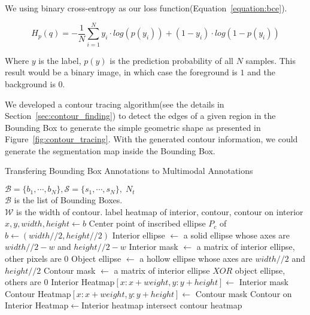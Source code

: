 \documentclass{article}
\begin{document}
{We using binary cross-entropy as our loss function(Equation~\ref{equation:bce}).

\begin{equation}
  H_p(q)=-\frac{1}{N}\sum^N_{i=1}y_i \cdot log(p(y_i))+(1-y_i)\cdot log(1-p(y_i))\label{equation:bce}
\end{equation}

Where $y$ is the label, $p(y)$ is the prediction probability of all $N$ samples. This result would be a binary image, in which case the foreground is $1$ and the background is $0$.

We developed a contour tracing algorithm(see the details in Section~\ref{sec:contour_finding}) to detect the edges of a given region in the Bounding Box to generate the simple geometric shape as presented in Figure~\ref{fig:contour_tracing}.
With the generated contour information, we could generate the segmentation map inside the Bounding Box.




\begin{algorithm}
  \caption{Transfering Bounding Box Annotations to Multimodal Annotations\label{algo:multimodal}}
  \begin{algorithmic}[1]
     \Require
     $\mathcal{B}=\{b_1,\cdots,b_N\}, \mathcal{S}=\{s_1,\cdots,s_N\},\;N_t$\\
     $\mathcal{B}$ is the list of Bounding Boxes.\\
     $\mathcal{W}$ is the width of contour.
     \Ensure
     label heatmap of interior, contour, contour on interior 
        \State $x, y, width, height \gets b$
        \State Center point of inscribed ellipse $P_c$ of $b \gets (width//2, height//2)$ 
        \State Interior ellipse $\gets$ a solid ellipse whose axes are $width//2-w$ and $height//2-w$
        \State Interior mask $\gets$ a matrix of interior ellipse, other pixels are $0$
        \State Object ellipse $\gets$ a hollow ellipse whose axes are $width//2$ and $height//2$
        \State Contour mask $\gets$ a matrix of interior ellipse $XOR$ object ellipse, others are $0$
        \State Interior Heatmap$[x:x+weight, y:y+height] \gets$ Interior mask
        \State Contour Heatmap$[x:x+weight, y:y+height] \gets$ Contour mask
     \EndFor
     \State Contour on Interior Heatmap$ \gets $Interior heatmap intersect contour heatmap
  \end{algorithmic}
\end{algorithm}




}
\end{document}
